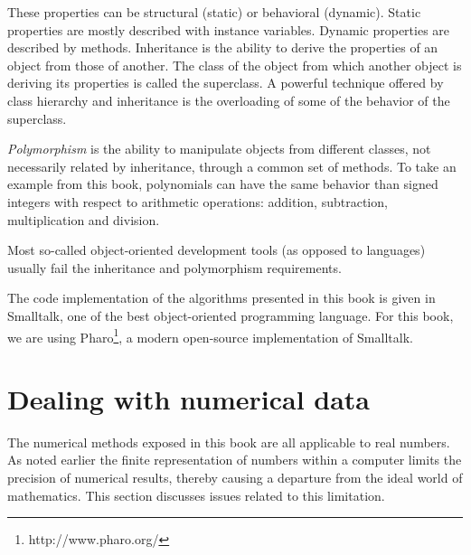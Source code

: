 \documentclass[twoside]{book}
\begin{document}
These properties can be structural (static) or behavioral
(dynamic). Static properties are mostly described with instance
variables. Dynamic properties are described by methods.
Inheritance is the ability to derive the properties of an object
from those of another. The class of the object from which another
object is deriving its properties is called the superclass. A
powerful technique offered by class hierarchy and inheritance is
the overloading of some of the behavior of the superclass.
\par
{\it Polymorphism} is the ability to manipulate objects from
different classes, not necessarily related by inheritance, through
a common set of methods. To take an example from this book,
polynomials can have the same behavior than signed integers with
respect to arithmetic operations: addition, subtraction,
multiplication and division.
\par
Most so-called object-oriented development tools (as opposed to
languages) usually fail the inheritance and polymorphism
requirements.
\par
The code implementation of the algorithms presented in this book
is given in Smalltalk, one of the best object-oriented programming language.
For this book, we are using Pharo\footnote{http://www.pharo.org/}, a modern
open-source implementation of Smalltalk.


\section{Dealing with numerical data}
The numerical methods exposed in this book are all applicable to
real numbers. As noted earlier the finite representation of
numbers within a computer limits the precision of numerical
results, thereby causing a departure from the ideal world of
mathematics. This section discusses issues related to this
limitation.
\end{document}
